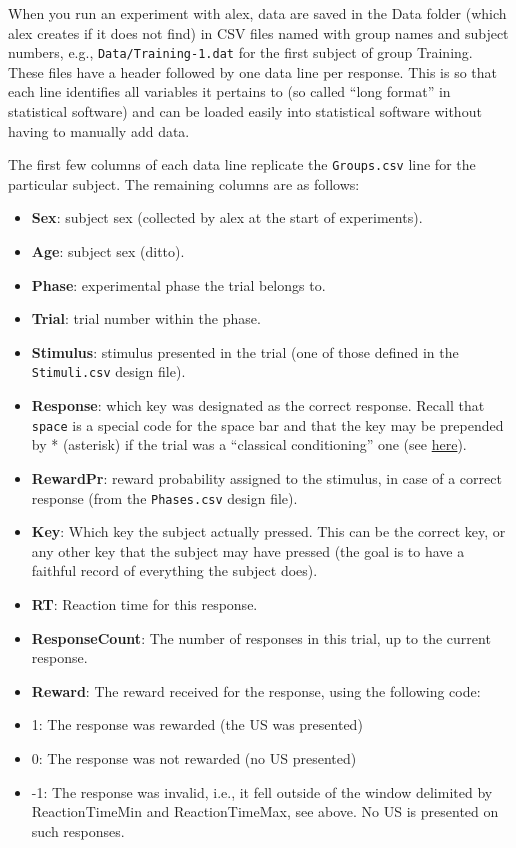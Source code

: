 \documentclass[11pt,]{article}
\begin{document}

When you run an experiment with alex, data are saved in the Data folder
(which alex creates if it does not find) in CSV files named with group
names and subject numbers, e.g., \texttt{Data/Training-1.dat} for the
first subject of group Training. These files have a header followed by
one data line per response. This is so that each line identifies all
variables it pertains to (so called ``long format'' in statistical
software) and can be loaded easily into statistical software without
having to manually add data.

The first few columns of each data line replicate the
\texttt{Groups.csv} line for the particular subject. The remaining
columns are as follows:

\begin{itemize}
\item
  \textbf{Sex}: subject sex (collected by alex at the start of
  experiments).
\item
  \textbf{Age}: subject sex (ditto).
\item
  \textbf{Phase}: experimental phase the trial belongs to.
\item
  \textbf{Trial}: trial number within the phase.
\item
  \textbf{Stimulus}: stimulus presented in the trial (one of those
  defined in the \texttt{Stimuli.csv} design file).
\item
  \textbf{Response}: which key was designated as the correct response.
  Recall that \texttt{space} is a special code for the space bar and
  that the key may be prepended by * (asterisk) if the trial was a
  ``classical conditioning'' one (see \hyperref[responses]{here}).
\item
  \textbf{RewardPr}: reward probability assigned to the stimulus, in
  case of a correct response (from the \texttt{Phases.csv} design file).
\item
  \textbf{Key}: Which key the subject actually pressed. This can be the
  correct key, or any other key that the subject may have pressed (the
  goal is to have a faithful record of everything the subject does).
\item
  \textbf{RT}: Reaction time for this response.
\item
  \textbf{ResponseCount}: The number of responses in this trial, up to
  the current response.
\item
  \textbf{Reward}: The reward received for the response, using the
  following code:
\item
  1: The response was rewarded (the US was presented)
\item
  0: The response was not rewarded (no US presented)
\item
  -1: The response was invalid, i.e., it fell outside of the window
  delimited by ReactionTimeMin and ReactionTimeMax, see above. No US is
  presented on such responses.
\end{itemize}
\end{document}
